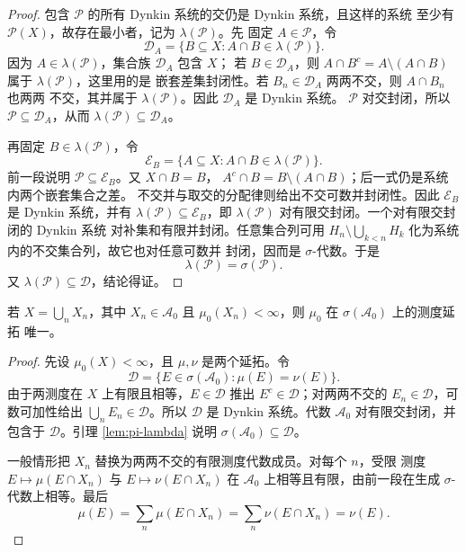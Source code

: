 \begin{proof}
包含 $\mathcal P$ 的所有 Dynkin 系统的交仍是 Dynkin 系统，且这样的系统
至少有 $\mathcal P(X)$，故存在最小者，记为 $\lambda(\mathcal P)$。先
固定 $A\in\mathcal P$，令
\[
 \mathcal D_A=\{B\subseteq X:A\cap B\in\lambda(\mathcal P)\}.
\]
因为 $A\in\lambda(\mathcal P)$，集合族 $\mathcal D_A$ 包含 $X$；
若 $B\in\mathcal D_A$，则
$A\cap B^c=A\setminus(A\cap B)$ 属于 $\lambda(\mathcal P)$，这里用的是
嵌套差集封闭性。若 $B_n\in\mathcal D_A$ 两两不交，则 $A\cap B_n$ 也两两
不交，其并属于 $\lambda(\mathcal P)$。因此 $\mathcal D_A$ 是 Dynkin 系统。
$\mathcal P$ 对交封闭，所以
$\mathcal P\subseteq\mathcal D_A$，从而
$\lambda(\mathcal P)\subseteq\mathcal D_A$。

再固定 $B\in\lambda(\mathcal P)$，令
\[
 \mathcal E_B=\{A\subseteq X:A\cap B\in\lambda(\mathcal P)\}.
\]
前一段说明 $\mathcal P\subseteq\mathcal E_B$。又 $X\cap B=B$，
$A^c\cap B=B\setminus(A\cap B)$；后一式仍是系统内两个嵌套集合之差。
不交并与取交的分配律则给出不交可数并封闭性。因此 $\mathcal E_B$ 是
Dynkin 系统，并有
$\lambda(\mathcal P)\subseteq\mathcal E_B$，即
$\lambda(\mathcal P)$ 对有限交封闭。一个对有限交封闭的 Dynkin 系统
对补集和有限并封闭。任意集合列可用
$H_n\setminus\bigcup_{k<n}H_k$ 化为系统内的不交集合列，故它也对任意可数并
封闭，因而是 $\sigma$-代数。于是
\[
 \lambda(\mathcal P)=\sigma(\mathcal P).
\]
又 $\lambda(\mathcal P)\subseteq\mathcal D$，结论得证。
\end{proof}

\begin{theorem}[延拓唯一性]
\label{thm:premeasure-extension-uniqueness}
若 $X=\bigcup_nX_n$，其中 $X_n\in\mathcal A_0$ 且
$\mu_0(X_n)<\infty$，则 $\mu_0$ 在 $\sigma(\mathcal A_0)$ 上的测度延拓
唯一。
\end{theorem}

\begin{proof}
先设 $\mu_0(X)<\infty$，且 $\mu,\nu$ 是两个延拓。令
\[
 \mathcal D=\{E\in\sigma(\mathcal A_0):\mu(E)=\nu(E)\}.
\]
由于两测度在 $X$ 上有限且相等，$E\in\mathcal D$ 推出
$E^c\in\mathcal D$；对两两不交的 $E_n\in\mathcal D$，可数可加性给出
$\bigcup_nE_n\in\mathcal D$。所以 $\mathcal D$ 是 Dynkin 系统。代数
$\mathcal A_0$ 对有限交封闭，并包含于 $\mathcal D$。引理
\ref{lem:pi-lambda} 说明
$\sigma(\mathcal A_0)\subseteq\mathcal D$。

一般情形把 $X_n$ 替换为两两不交的有限测度代数成员。对每个 $n$，受限
测度 $E\mapsto\mu(E\cap X_n)$ 与 $E\mapsto\nu(E\cap X_n)$ 在
$\mathcal A_0$ 上相等且有限，由前一段在生成 $\sigma$-代数上相等。最后
\[
 \mu(E)=\sum_n\mu(E\cap X_n)
 =\sum_n\nu(E\cap X_n)=\nu(E).
\]
\end{proof}

